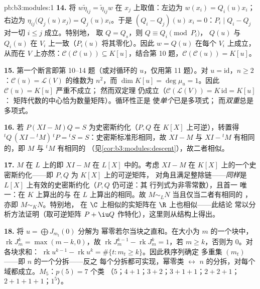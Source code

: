 \begin{solution}{pb:b3:modules:1}
\textbf{14.} 将 $w\tilde\eta_{ij} = \tilde\eta_{ij}w$ 在
$x_j$ 上取值：左边为 $w(x_i) = Q_i(u)x_i$；右边为
$\eta_{ij}\bigl(Q_j(u)x_j\bigr) = Q_j(u)x_i$。于是 $(Q_i -
Q_j)(u)\,x_i = 0$：$P_i \mid Q_i - Q_j$ 对一切 $i \leq j$ 成立。特别地，
取 $Q = Q_s$，则 $Q \equiv Q_i \pmod{P_i}$，
$Q(u)$ 与 $Q_i(u)$ 在 $V_i$ 上一致（$P_i(u)$ 将其零化）。因此 $w
= Q(u)$ 在每个 $V_i$ 上成立，从而在 $V$ 上亦然：$\mathcal C(\mathcal C(u))
\subseteq K[u]$，结合第 10 题，$\mathcal C(\mathcal
C(u)) = K[u]$。

\textbf{15.} 第一个断言即第 10--14 题（或对循环的
$u$，仅用第 11 题）。对 $u = \mathrm{id}$，$n \geq
2$：$\mathcal C(u) = \mathcal L(V)$ 的维数为 $n^2$，而
$\dim K[u] = \deg\mu_u = 1$。因此 $\mathcal C(u) = K[u]$ 严重不成立；
然而双定理
仍成立（$\mathcal C(\mathcal L(V)) = K\,\mathrm{id} = K[u]$：
矩阵代数的中心恰为数量矩阵）。循环性正是
使\emph{单个}已是多项式；
而\emph{双重}总是多项式。

\textbf{16.} 若 $P(XI - M)Q = S$ 为史密斯约化（$P, Q$
在 $K[X]$ 上可逆），转置得 ${}^tQ\,(XI -
{}^tM)\,{}^tP = {}^tS = S$：史密斯标准形相同，故 $XI - M$ 与
$XI - {}^tM$ 有相同的，即 $M$ 与
${}^tM$ 有相同的
（见\cref{cor:b3:modules:descent}），故二者相似。

\textbf{17.} $M$ 在 $L$ 上的即
$XI - M$ 在 $L[X]$ 中的。考虑
$XI - M$ 在 $K[X]$ 上的一个史密斯约化——即 $P, Q$ 为 $K[X]$ 上的可逆矩阵，
对角且满足整除链——\emph{同样}是
$L[X]$ 上有效的史密斯约化（$P, Q$ 仍可逆：其
行列式为非零常数），且首一
唯一：在 $K$ 上算出的与
在 $L$ 上算出的相同。故 $M \sim_L N$ 当且仅当二者有相同的
，亦即 $M \sim_K N$。特别地，
在 $\C$ 上相似的实矩阵在 $\R$ 上也相似——此结论
常以分析方法证明（取可逆矩阵 $P + \iu
Q$ 作特化），这里则从结构上得出。

\textbf{18.} 将 $u = \bigoplus J_{m_t}(0)$ 分解为
幂零若尔当块之直和。在大小为 $m$ 的一个块中，
$\operatorname{rk}J_m^k = \max(m - k, 0)$，故
$\operatorname{rk}J_m^{k-1} - \operatorname{rk}J_m^k = 1$，若 $m
\geq k$，否则为 $0$。对各块求和：
$\operatorname{rk}u^{k-1} - \operatorname{rk}u^k =
\#\{t : m_t \geq k\}$。因此秩序列确定
多重集 $(m_t)$——即 $n$ 的一个分拆——反之
每个分拆都可实现，幂零类 $\leftrightarrow$
$n$ 的分拆，对每个域都成立。$M_5$：$p(5) = 7$ 个类
（$5$；$4{+}1$；$3{+}2$；$3{+}1{+}1$；$2{+}2{+}1$；
$2{+}1{+}1{+}1$；$1^5$）。


\end{solution}
